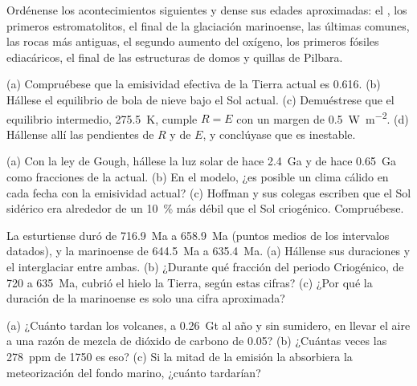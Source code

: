 \begin{exercise}[$\star$]\label{exo:b2:precambrian-earth:4}
Ordénense los acontecimientos siguientes y dense sus edades aproximadas: el , los
primeros estromatolitos, el final de la glaciación marinoense, las últimas  comunes, las
rocas más antiguas, el segundo aumento del oxígeno, los primeros fósiles ediacáricos, el final de las estructuras de domos y
quillas de Pilbara.
\end{exercise}

\begin{exercise}[$\star\star$]\label{exo:b2:precambrian-earth:5}
(a) Compruébese que la emisividad efectiva de la Tierra actual es 0.616. (b) Hállese el equilibrio de bola de
nieve bajo el Sol actual. (c) Demuéstrese que el equilibrio intermedio, \qty{275.5}{K}, cumple
$R = E$ con un margen de \qty{0.5}{W.m^{-2}}. (d) Hállense allí las pendientes de $R$ y de $E$, y conclúyase
que es inestable.
\end{exercise}

\begin{exercise}[$\star\star$]\label{exo:b2:precambrian-earth:6}
(a) Con la ley de Gough, hállese la luz solar de hace \qty{2.4}{Ga} y de hace \qty{0.65}{Ga} como fracciones
de la actual. (b) En el modelo, ¿es posible un clima cálido en cada fecha con la emisividad actual?
(c) Hoffman y sus colegas escriben que el Sol sidérico era alrededor de un \qty{10}{\percent} más débil que
el Sol criogénico. Compruébese.
\end{exercise}

\begin{exercise}[$\star\star$]\label{exo:b2:precambrian-earth:7}
La esturtiense duró de \qty{716.9}{Ma} a \qty{658.9}{Ma} (puntos medios de los intervalos datados),
y la marinoense de \qty{644.5}{Ma} a \qty{635.4}{Ma}. (a) Hállense sus duraciones y el
interglaciar entre ambas. (b) ¿Durante qué fracción del periodo Criogénico, de 720 a \qty{635}{Ma},
cubrió el hielo la Tierra, según estas cifras? (c) ¿Por qué la duración de la marinoense es solo una
cifra aproximada?
\end{exercise}

\begin{exercise}[$\star\star$]\label{exo:b2:precambrian-earth:8}
(a) ¿Cuánto tardan los volcanes, a \qty{0.26}{Gt} al año y sin sumidero, en llevar el aire a
una razón de mezcla de dióxido de carbono de 0.05? (b) ¿Cuántas veces las \qty{278}{ppm} de 1750 es eso? (c) Si la mitad de la emisión la absorbiera la meteorización del fondo
marino, ¿cuánto tardarían?
\end{exercise}

